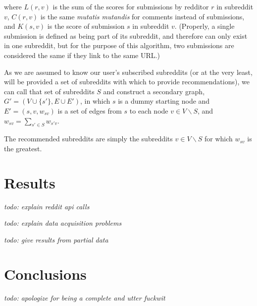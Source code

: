 \documentclass[journal, draftclsnofoot]{./styles/IEEEtran}
\begin{document}
where $L(r, v)$ is the sum of the scores for submissions by redditor $r$
in subreddit $v$, $C(r, v)$ is the same \textit{mutatis mutandis} for
comments instead of submissions, and $K(s, v)$ is the score of
submission $s$ in subreddit $v$. (Properly, a single submission is
defined as being part of its subreddit, and therefore can only exist in
one subreddit, but for the purpose of this algorithm, two submissions
are considered the same if they link to the same URL.)

As we are assumed to know our user's subscribed subreddits (or at the
very least, will be provided a set of subreddits with which to provide
recommendations), we can call that set of subreddits $S$ and construct a
secondary graph, $G' = (V \cup \{s'\}, E \cup E')$, in which $s$ is a
dummy starting node and $E' = (s, v, w_{sv})$ is a set of edges from $s$
to each node $v \in V\backslash S$, and $w_{sv} = \sum_{s' \in S}
w_{s'v}$.

The recommended subreddits are simply the subreddits $v \in V\backslash
S$ for which $w_{sv}$ is the greatest.

\section{Results}

\textit{todo: explain reddit api calls}

\textit{todo: explain data acquisition problems}

\textit{todo: give results from partial data}

\section{Conclusions}

\textit{todo: apologize for being a complete and utter fuckwit}




\nocite{*}



\end{document}
